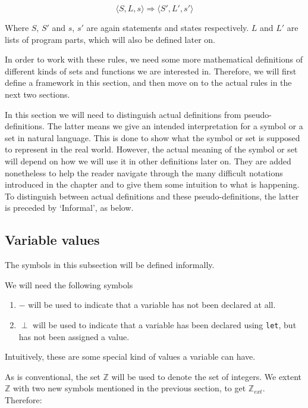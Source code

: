 $$\langle S, L, s \rangle \Rightarrow \langle S', L', s' \rangle$$

Where $S$, $S'$ and $s$, $s'$ are again statements and states respectively. $L$ and $L'$ are lists of program parts, which will also be defined later on. 

In order to work with these rules, we need some more mathematical definitions of different kinds of sets and functions we are interested in. Therefore, we will first define a framework in this section, and then move on to the actual rules in the next two sections. 

In this section we will need to distinguish actual definitions from pseudo-definitions. The latter means we give an intended interpretation for a symbol or a set in natural language. This is done to show what the symbol or set is supposed to represent in the real world. However, the actual meaning of the symbol or set will depend on how we will use it in other definitions later on. They are added nonetheless to help the reader navigate through the many difficult notations introduced in the chapter and to give them some intuition to what is happening. To distinguish between actual definitions and these pseudo-definitions, the latter is preceded by `Informal', as below. 

\subsection*{Variable values}
The symbols in this subsection will be defined informally.  

\begin{infdefinition}
We will need the following symbols 
\begin{enumerate}[noitemsep, label={\roman*)}]
    \item $-$ will be used to indicate that a variable has not been declared at all.
    \item $\perp$ will be used to indicate that a variable has been declared using \verb|let|, but has not been assigned a value.
\end{enumerate}
\end{infdefinition}

Intuitively, these are some special kind of values a variable can have. 

As is conventional, the set $\mathbb{Z}$ will be used to denote the set of integers. We extent $\mathbb{Z}$ with two new symbols mentioned in the previous section, to get $\mathbb{Z}_{ext}$. Therefore: 

